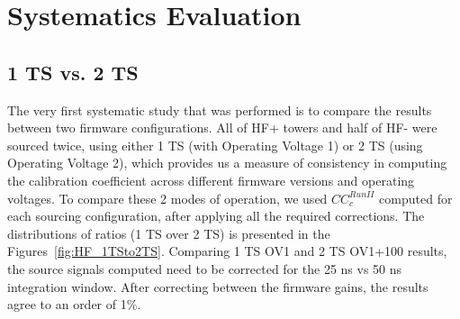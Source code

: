 \section{Systematics Evaluation}
\subsection{1 TS vs. 2 TS}
The very first systematic study that was performed is to compare the results between two
firmware configurations. All of HF+ towers and half of HF- were sourced twice,
using either 1 TS (with Operating Voltage 1) or 2 TS (using Operating Voltage 2),
which provides us a measure of consistency in computing the calibration
coefficient across different firmware versions and operating voltages.
To compare these 2 modes of operation, we used ${CC}^{Run II}_{c}$ computed for
each sourcing configuration, after applying all the required corrections. The
distributions of ratios (1 TS over 2 TS) is presented in the Figures~\ref{fig:HF_1TSto2TS}. Comparing 1 TS OV1 and 2 TS OV1+100 results, the source signals computed need to be corrected for the 25 ns vs 50 ns integration window. After correcting between the firmware gains, the results agree to an order of 1\%.

